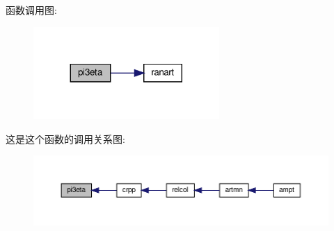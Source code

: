 函数调用图\+:
\nopagebreak
\begin{figure}[H]
\begin{center}
\leavevmode
\includegraphics[width=200pt]{pi3eta_8f90_a65f01827efdafa3f970dcc4d3ea3ce9c_cgraph}
\end{center}
\end{figure}
这是这个函数的调用关系图\+:
\nopagebreak
\begin{figure}[H]
\begin{center}
\leavevmode
\includegraphics[width=350pt]{pi3eta_8f90_a65f01827efdafa3f970dcc4d3ea3ce9c_icgraph}
\end{center}
\end{figure}
